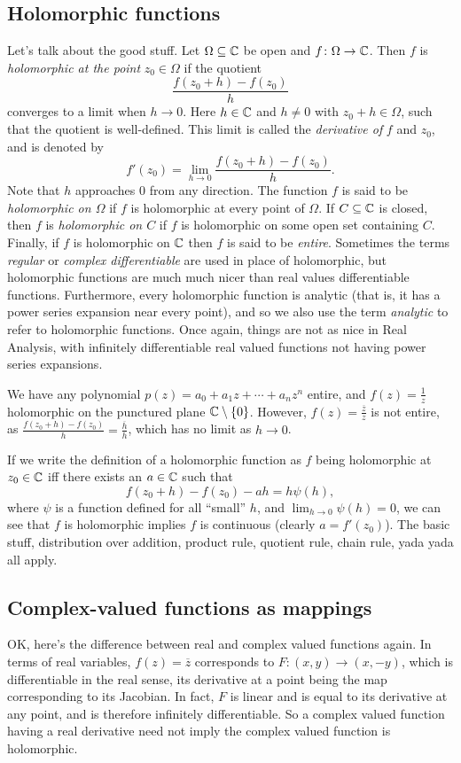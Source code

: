 \subsection{Holomorphic functions}
Let's talk about the good stuff. Let $\Omega \subseteq \mathbb{C}$ be open and $f \colon \Omega \to \mathbb{C}$. Then $f$ is \emph{holomorphic at the point} $z_0 \in \Omega$ if the quotient \[
    \frac{f(z_0+h)-f(z_0)}{h}
\] converges to a limit when $h\to 0$. Here $h\in \mathbb{C}$ and $h\neq 0$ with $z_0+h\in \Omega$, such that the quotient is well-defined. This limit is called the \emph{derivative of} $f$ and $z_0$, and is denoted by \[
f'(z_0) = \lim_{h\to 0}\frac{f(z_0+h)-f(z_0)}{h}.
\] Note that $h$ approaches $0$ from any direction. The function $f$ is said to be \emph{holomorphic on $\Omega$} if $f$ is holomorphic at every point of $\Omega$. If $C\subseteq \mathbb{C}$ is closed, then $f$ is \emph{holomorphic on $C$} if $f$ is holomorphic on some open set containing $C$. Finally, if $f$ is holomorphic on $\mathbb{C}$ then $f$ is said to be \emph{entire}. Sometimes the terms \emph{regular} or \emph{complex differentiable} are used in place of holomorphic, but holomorphic functions are much much nicer than real values differentiable functions. Furthermore, every holomorphic function is analytic (that is, it has a power series expansion near every point), and so we also use the term \emph{analytic} to refer to holomorphic functions. Once again, things are not as nice in Real Analysis, with infinitely differentiable real valued functions not having power series expansions.
\begin{example}
    We have any polynomial $p(z)=a_0+a_1z+\cdots+a_nz^n$ entire, and $f(z)=\frac{1}{z}$ holomorphic on the punctured plane $\mathbb{C}\setminus \{0\} $. However, $f(z)=\frac{\overline{z}}{z}$ is not entire, as $\frac{f(z_0+h)-f(z_0)}{h}=\frac{\overline{h}}{h}$, which has no limit as $h\to 0$.
\end{example}
If we write the definition of a holomorphic function as $f$ being holomorphic at $z_0\in \mathbb{C}$ iff there exists an $a\in \mathbb{C}$ such that\[
    f(z_0+h)-f(z_0)-ah=h\psi(h),
\] where $\psi$ is a function defined for all ``small'' $h$, and $\lim_{h\to 0}\psi(h)=0$, we can see that $f$ is holomorphic implies $f$ is continuous (clearly $a=f'(z_0)$). The basic stuff, distribution over addition, product rule, quotient rule, chain rule, yada yada all apply.
\subsection{Complex-valued functions as mappings}
OK, here's the difference between real and complex valued functions again. In terms of real variables, $f(z)=\overline{z}$ corresponds to $F \colon (x,y) \to (x,-y)$, which is differentiable in the real sense, its derivative at a point being the map corresponding to its Jacobian. In fact, $F$ is linear and is equal to its derivative at any point, and is therefore infinitely differentiable. So a complex valued function having a real derivative need not imply the complex valued function is holomorphic.



